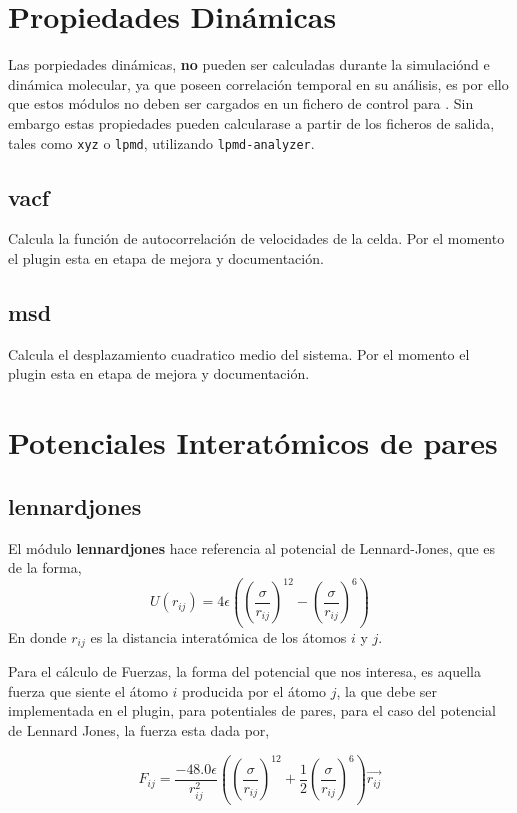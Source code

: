\section{Propiedades Din\'amicas}
Las porpiedades din\'amicas, \textbf{no} pueden ser calculadas durante la simulaci\'ond e din\'amica molecular, ya que poseen correlaci\'on temporal en su an\'alisis, es por ello que estos m\'odulos no deben ser cargados en un fichero de control para {\lpmd}. Sin embargo estas propiedades pueden calcularase a partir de los ficheros de salida, tales como \verb|xyz| o \verb|lpmd|, utilizando \verb|lpmd-analyzer|.
\subsection{vacf}
Calcula la funci\'on de autocorrelaci\'on de velocidades de la celda. Por el momento el plugin esta en etapa de mejora y documentaci\'on.
\subsection{msd}
Calcula el desplazamiento cuadratico medio del sistema. Por el momento el plugin esta en etapa de mejora y documentaci\'on.


\section{Potenciales Interat\'omicos de pares}
\subsection{lennardjones}
El m\'odulo \textbf{lennardjones} hace referencia al potencial de Lennard-Jones, que es de la forma,
$$U(r_{ij}) = 4\epsilon\left(\left(\frac{\sigma}{r_{ij}}\right)^{12}-\left(\frac{\sigma}{r_{ij}}\right)^6\right)$$
En donde $r_{ij}$ es la distancia interat\'omica de los \'atomos $i$ y $j$. 

Para el c\'alculo de Fuerzas, la forma del potencial que nos interesa, es aquella fuerza que siente el \'atomo $i$ producida por el \'atomo $j$, la que debe ser implementada en el plugin, para potentiales de pares, para el caso del potencial de Lennard Jones, la fuerza esta dada por,

$$F_{ij} = \frac{-48.0\epsilon}{r_{ij}^2}\left( \left(\frac{\sigma}{r_{ij}}\right)^{12} + \frac{1}{2}\left(\frac{\sigma}{r_{ij}}\right)^6 \right) \vec{r_{ij}}$$


